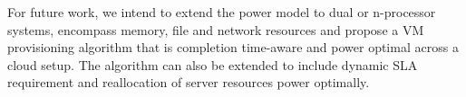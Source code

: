 \documentclass{sig-alternate}
\begin{document}
For future work, we intend to extend the power model to dual or n-processor systems, encompass memory, file and network resources and propose a VM provisioning algorithm that is completion time-aware and power optimal across a cloud setup. The algorithm can also be extended to include dynamic SLA requirement and reallocation of server resources power optimally. 



\scriptsize{}
 
\balancecolumns
\end{document}
